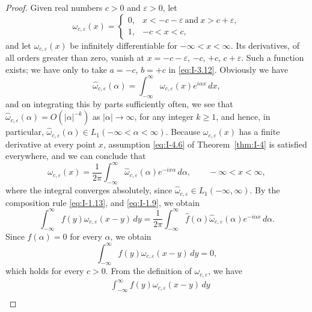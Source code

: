\begin{proof}
Given real numbers $c>0$ and $\varepsilon>0$, let
\begin{equation*}
\omega_{c,\varepsilon}(x)=
\begin{cases}
0,&x<-c-\varepsilon\ \text{and}\ x>c+\varepsilon,\\
1,& -c<x<c,
\end{cases}
\end{equation*}
and let $\omega_{c,\varepsilon}(x)$ be infinitely differentiable for $-\infty<x<\infty$. Its derivatives, of all orders greater than zero, vanish at $x=-c-\varepsilon$, $-c$, $+c$, $c+\varepsilon$. Such a function exists; we have only to take $a=-c$, $b=+c$ in \eqref{eq:I-3.12}. Obviously we have
\begin{equation*}
\hat\omega_{c,\varepsilon}(\alpha)=\int_{-\infty}^{\infty}\omega_{c,\varepsilon}(x)e^{i\alpha x}\,dx,
\end{equation*}
and on integrating this by parts sufficiently often, we see that $\hat\omega_{c,\varepsilon}(\alpha)=O(|\alpha|^{-k})$ as $|\alpha|\to\infty$, for any integer $k\ge 1$, and hence, in particular, $\hat\omega_{c,\varepsilon}(\alpha)\in L_1(-\infty<\alpha<\infty)$. Because $\omega_{c,\varepsilon}(x)$ has a finite derivative at every point $x$, assumption \eqref{eq:I-4.6} of Theorem~\ref{thm:I-4} is satisfied everywhere, and we can conclude that
\begin{equation*}
\omega_{c,\varepsilon}(x)=\frac{1}{2\pi}\int_{-\infty}^{\infty}\hat\omega_{c,\varepsilon}(\alpha)e^{-ix\alpha}\,d\alpha,
\qquad-\infty<x<\infty,
\end{equation*}
where the integral converges absolutely, since $\hat\omega_{c,\varepsilon}\in L_1(-\infty,\infty)$. By the composition rule \eqref{eq:I-1.13}, and \eqref{eq:I-1.9}, we obtain
\begin{equation*}
\int_{-\infty}^{\infty}f(y)\omega_{c,\varepsilon}(x-y)\,dy
=\frac{1}{2\pi}\int_{-\infty}^{\infty}\hat f(\alpha)\hat\omega_{c,\varepsilon}(\alpha)e^{-i\alpha x}\,d\alpha.
\end{equation*}
Since $\hat f(\alpha)=0$ for every $\alpha$, we obtain
\begin{equation}\label{eq:I-6.1}
\int_{-\infty}^{\infty}f(y)\omega_{c,\varepsilon}(x-y)\,dy=0,
\end{equation}
which holds for every $c>0$. From the definition of $\omega_{c,\varepsilon}$, we have
\begin{equation*}
\begin{aligned}
&\int_{-\infty}^{\infty}f(y)\omega_{c,\varepsilon}(x-y)\,dy\\

\end{aligned}
\end{equation*}
\end{proof}
